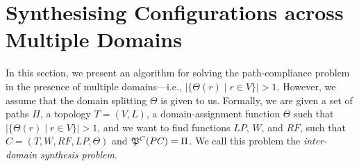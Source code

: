\section{Synthesising Configurations across Multiple Domains}
\label{sec:synth-multi}

In this section, we present an algorithm for 
solving the path-compliance problem in the presence
of multiple domains---i.e., $|\{\Theta(r) \mid r\in V\}|>1$.
However, we assume that the domain splitting $\Theta$ is given to us.
Formally, we are given a set of paths $\Pi$,
a topology $T=(V,L)$,
a domain-assignment function $\Theta$ such that $|\{\Theta(r) \mid r\in V\}|>1$, 
and we want to find functions
$LP$, $W$, and $RF$,  such that
$C=(T,W,RF,LP,\Theta)$ and
$\mathfrak{P}^C(PC) = \Pi$.
We call this problem the \emph{inter-domain synthesis problem}.

\begin{figure}
	\centering
\end{figure}


